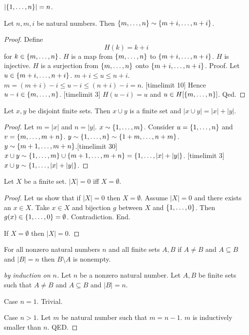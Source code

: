 \documentclass{article}
\begin{document}
\begin{forthel}
  \begin{lemma}
  $|\{1,\dots,n\}| = n$.
  \end{lemma}
  
  \begin{lemma}
  Let $n,m,i$ be natural numbers.
  Then $\{m,\dots,n\} \sim \{m+i,\dots,n+i\}$.
  \end{lemma}
  \begin{proof}
  Define \[ H(k) = k + i \]
          for $k \in \{m,\dots,n\}$.
  $H$ is a map from $\{m,\dots,n\}$ to $\{m+i,\dots,n+i\}$.
  $H$ is injective.
  $H$ is a surjection from $\{m,\dots,n\}$ onto $\{m+i,\dots,n+i\}$.
  Proof.
  Let $u \in \{m+i,\dots,n+i\}$. $m + i \leq u \leq n + i$.
  $m  = (m + i) - i \leq u - i \leq (n + i) - i = n$.
[timelimit 10]
  Hence $u - i \in \{m,\dots,n\}$.
[timelimit 3] $H(u-i) = u$ and 
  $u \in H[\{m,\dots,n\}]$.
  Qed.
  \end{proof}
  
  \begin{lemma}
  Let $x,y$ be disjoint finite sets.
  Then $x \cup y$ is a finite set and $|x \cup y| = |x| + |y|$.
  \end{lemma}
  \begin{proof}
  Let $m = |x|$ and $n = |y|$.
  $x \sim \{1,\dots,m\}$.
  Consider $u = \{1,\dots,n\}$ and $v = \{m,\dots,m+n\}$. 
  $y \sim \{1,\dots,n\} \sim \{1+m,\dots,n+m\}$.
  $y \sim \{m+1,\dots,m+n\}$.[timelimit 30]
  $x \cup y \sim \{1,\dots,m\} \cup \{m+1,\dots,m+n\} = \{1,\dots,|x|+|y|\}$. [timelimit 3]
  $x \cup y \sim \{1,\dots,|x|+|y|\}$.
  \end{proof}

\begin{lemma}
	Let $X$ be a finite set.
	$|X| = 0$ iff $X = \emptyset$.
\end{lemma}
\begin{proof}
	Let us show that if $|X| = 0$ then $X = \emptyset$.
	Assume $|X| = 0$ and there exists an $x \in X$.
	Take $x \in X$ and bijection $g$ between $X$ and $\{1,\dots,0\}$. Then $g(x) \in \{1,\dots,0\} = \emptyset$. Contradiction. End.
	
	If $X = \emptyset$ then $|X| = 0$. 
\end{proof}

\begin{lemma}
	For all nonzero natural numbers $n$ and all finite sets $A,B$
	if $A \neq B$ and $A \subseteq B$ and $|B| = n$ 
	then $B \setminus A$ is nonempty.
\end{lemma}
\begin{proof}[by induction on $n$]
	Let $n$ be a nonzero natural number.
	Let $A,B$ be finite sets such that
	$A \neq B$ and $A \subseteq B$ and $|B| = n$.
	
	Case $n=1$.
	Trivial.
	
	Case $n > 1$.
	Let $m$ be natural number such that $m = n-1$.
	$m$ is inductively smaller than $n$.
	QED.
\end{proof}

\end{forthel}
\end{document}
